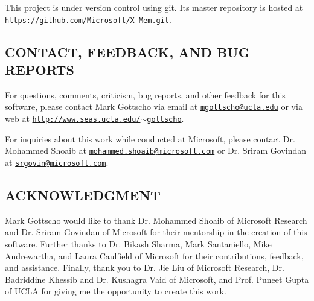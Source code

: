 This project is under version control using git. Its master repository is hosted at \href{https://github.com/Microsoft/X-Mem.git}{\tt https\+://github.\+com/\+Microsoft/\+X-\/\+Mem.\+git}. 

 \subsection*{C\+O\+N\+T\+A\+C\+T, F\+E\+E\+D\+B\+A\+C\+K, A\+N\+D B\+U\+G R\+E\+P\+O\+R\+T\+S }

For questions, comments, criticism, bug reports, and other feedback for this software, please contact Mark Gottscho via email at \href{mailto:mgottscho@ucla.edu}{\tt mgottscho@ucla.\+edu} or via web at \href{http://www.seas.ucla.edu/~gottscho}{\tt http\+://www.\+seas.\+ucla.\+edu/$\sim$gottscho}.

For inquiries about this work while conducted at Microsoft, please contact Dr. Mohammed Shoaib at \href{mailto:mohammed.shoaib@microsoft.com}{\tt mohammed.\+shoaib@microsoft.\+com} or Dr. Sriram Govindan at \href{mailto:srgovin@microsoft.com}{\tt srgovin@microsoft.\+com}. 

 \subsection*{A\+C\+K\+N\+O\+W\+L\+E\+D\+G\+M\+E\+N\+T }

Mark Gottscho would like to thank Dr. Mohammed Shoaib of Microsoft Research and Dr. Sriram Govindan of Microsoft for their mentorship in the creation of this software. Further thanks to Dr. Bikash Sharma, Mark Santaniello, Mike Andrewartha, and Laura Caulfield of Microsoft for their contributions, feedback, and assistance. Finally, thank you to Dr. Jie Liu of Microsoft Research, Dr. Badriddine Khessib and Dr. Kushagra Vaid of Microsoft, and Prof. Puneet Gupta of U\+C\+L\+A for giving me the opportunity to create this work. 